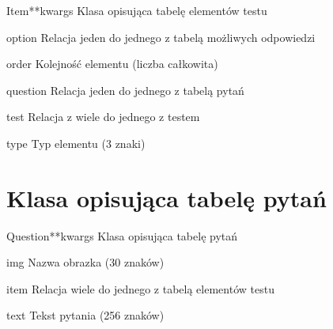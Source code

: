 \documentclass[letterpaper,10pt,polish]{manual}
\begin{document}
\hypertarget{dbmodel.Item}{}\begin{classdesc}{Item}{**kwargs}
Klasa opisująca tabelę elementów testu

\hypertarget{dbmodel.Item.option}{}\begin{memberdesc}{option}
Relacja jeden do jednego z tabelą możliwych odpowiedzi
\end{memberdesc}

\hypertarget{dbmodel.Item.order}{}\begin{memberdesc}{order}
Kolejność elementu (liczba całkowita)
\end{memberdesc}

\hypertarget{dbmodel.Item.question}{}\begin{memberdesc}{question}
Relacja jeden do jednego z tabelą pytań
\end{memberdesc}

\hypertarget{dbmodel.Item.test}{}\begin{memberdesc}{test}
Relacja z wiele do jednego z testem
\end{memberdesc}

\hypertarget{dbmodel.Item.type}{}\begin{memberdesc}{type}
Typ elementu (3 znaki)
\end{memberdesc}
\end{classdesc}
\hypertarget{dbmodel-question}{}

\section{Klasa opisująca tabelę pytań}

\hypertarget{dbmodel.Question}{}\begin{classdesc}{Question}{**kwargs}
Klasa opisująca tabelę pytań

\hypertarget{dbmodel.Question.img}{}\begin{memberdesc}{img}
Nazwa obrazka (30 znaków)
\end{memberdesc}

\hypertarget{dbmodel.Question.item}{}\begin{memberdesc}{item}
Relacja wiele do jednego z tabelą elementów testu
\end{memberdesc}

\hypertarget{dbmodel.Question.text}{}\begin{memberdesc}{text}
Tekst pytania (256 znaków)
\end{memberdesc}
\end{classdesc}
\hypertarget{dbmodel-option}{}
\end{document}
